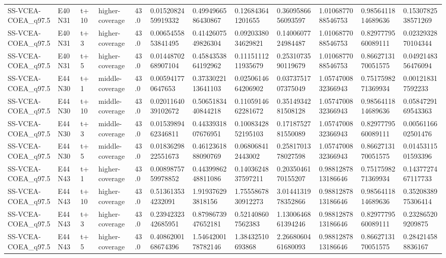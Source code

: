 \begin{landscape}
\begin{longtable}{llllllllllll}
SS-VCEA-COEA\_q97.5 & E40N31 & t+10 & higher-coverage & 43.0 & 0.0152082459919332 & 0.4994966586430867 & 0.126843641201655 & 0.3609586656093597 & 1.0106877088546753 & 0.9856411814689636 & 0.1530782538571269 \\
SS-VCEA-COEA\_q97.5 & E40N31 & t+3 & higher-coverage & 43.0 & 0.0065455853841495 & 0.4142607549826304 & 0.0920338034629821 & 0.1400607724984487 & 1.0106877088546753 & 0.8297779560089111 & 0.0232932870104344 \\
SS-VCEA-COEA\_q97.5 & E40N31 & t+5 & higher-coverage & 43.0 & 0.0144870268907104 & 0.4584353864192962 & 0.1115111211935679 & 0.2531073590119679 & 1.0106877088546753 & 0.8662713170051575 & 0.0492148356476094 \\
SS-VCEA-COEA\_q97.5 & E44N30 & t+1 & middle-coverage & 43.0 & 0.005941770647653 & 0.3733022113641103 & 0.0250614664206902 & 0.0373751707375049 & 1.0574700832366943 & 0.7517598271369934 & 0.001218317592233 \\
SS-VCEA-COEA\_q97.5 & E44N30 & t+10 & middle-coverage & 43.0 & 0.0201164039102672 & 0.5065183440844218 & 0.1105914662281672 & 0.3514934281508128 & 1.0574700832366943 & 0.9856411814689636 & 0.0584729169543363 \\
SS-VCEA-COEA\_q97.5 & E44N30 & t+3 & middle-coverage & 43.0 & 0.0153989462346811 & 0.4433931807676951 & 0.1008342852195103 & 0.1718752781550089 & 1.0574700832366943 & 0.8297779560089111 & 0.0056116602501476 \\
SS-VCEA-COEA\_q97.5 & E44N30 & t+5 & middle-coverage & 43.0 & 0.0183629822551673 & 0.4612361888090769 & 0.068068412443002 & 0.2581701378027598 & 1.0574700832366943 & 0.8662713170051575 & 0.0145311501593396 \\
SS-VCEA-COEA\_q97.5 & E44N43 & t+1 & higher-coverage & 43.0 & 0.0089875759978852 & 0.4439986248811086 & 0.1403624837597211 & 0.2035046170155207 & 0.9881287813186646 & 0.7517598271369934 & 0.1437727467117733 \\
SS-VCEA-COEA\_q97.5 & E44N43 & t+10 & higher-coverage & 43.0 & 0.513613534232091 & 1.919376293818156 & 1.7555867830912273 & 3.0144131978352866 & 0.9881287813186646 & 0.9856411814689636 & 0.3520838975306414 \\
SS-VCEA-COEA\_q97.5 & E44N43 & t+3 & higher-coverage & 43.0 & 0.2394232342685951 & 0.8798673947652181 & 0.521408607562383 & 1.1300646861394246 & 0.9881287813186646 & 0.8297779560089111 & 0.232865209209875 \\
SS-VCEA-COEA\_q97.5 & E44N43 & t+5 & higher-coverage & 43.0 & 0.4086200168674396 & 1.5464200178782146 & 1.38432510693868 & 2.2668060461680093 & 0.9881287813186646 & 0.8662713170051575 & 0.284214588836167 \\

\end{longtable}
\end{landscape}
